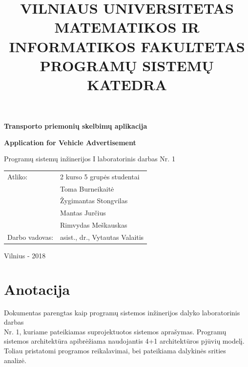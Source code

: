\documentclass[12pt]{article}
\title{VILNIAUS UNIVERSITETAS \bigbreak \bigbreak 
MATEMATIKOS IR INFORMATIKOS FAKULTETAS \bigbreak \bigbreak 
PROGRAMŲ SISTEMŲ KATEDRA}
\author{}
\date{}
\begin{document}
	\clearpage
	\maketitle
	\thispagestyle{empty}

	\begin{center}
		\begin{Large}
			\textbf{Transporto priemonių skelbimų aplikacija} \bigbreak
		\end{Large}
		\begin{large}
			\textbf{Application for Vehicle Advertisement} \bigbreak
		\end{large}
		Programų sistemų inžinerijos I laboratorinis darbas Nr. 1 \bigbreak

		\bigbreak
		\bigbreak
		\bigbreak
		\bigbreak
		\bigbreak
		\bigbreak
		\bigbreak

		\begin{tabular}{ll}
			Atliko:        & 2 kurso 5 grupės studentai \\
		               	   & Toma Burneikaitė \\
		               	   & Žygimantas Stongvilas \\
		                   & Mantas Jurčius \\
		                   & Rimvydas Meškauskas \\
			Darbo vadovas: & asist., dr., Vytautas Valaitis
		\end{tabular}

		\bigbreak
		\bigbreak
		\bigbreak
		\bigbreak
		\bigbreak
		\bigbreak
		\bigbreak
		\bigbreak
		\bigbreak
		\bigbreak
		\bigbreak
		\bigbreak
		\bigbreak
		\bigbreak
		\bigbreak

		Vilnius - 2018
	\end{center}
	\pagebreak
	
	\section*{Anotacija}
	\begin{indent}
	Dokumentas parengtas kaip programų sistemos inžinerijos dalyko laboratorinis darbas\\Nr. 1, kuriame pateikiamas suprojektuotos sistemos aprašymas. Programų sistemos architektūra apibrėžiama naudojantis 4+1 architektūros pjūvių modelį. Toliau pristatomi programos reikalavimai, bei pateikiama dalykinės srities analizė.
	\end{indent}
	\pagebreak
\end{document}

